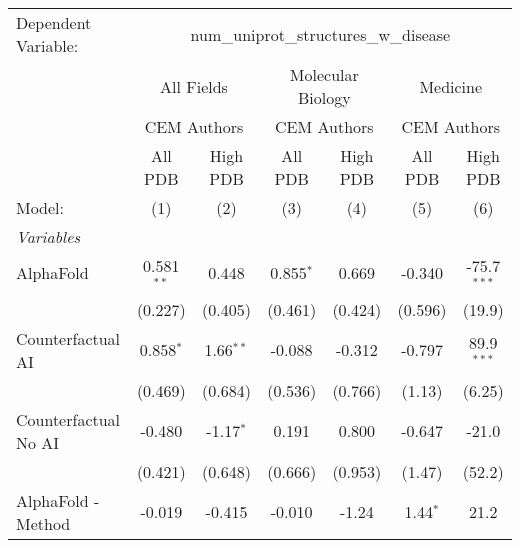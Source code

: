 \begingroup
\centering
\begin{tabular}{lcccccc}
   \tabularnewline \midrule \midrule
   Dependent Variable: & \multicolumn{6}{c}{num\_uniprot\_structures\_w\_disease}\\
 & \multicolumn{2}{c}{All Fields} & \multicolumn{2}{c}{Molecular Biology} & \multicolumn{2}{c}{Medicine} \\
\cmidrule(lr){2-3} \cmidrule(lr){4-5} \cmidrule(lr){6-7}
 & \multicolumn{2}{c}{CEM Authors} & \multicolumn{2}{c}{CEM Authors} & \multicolumn{2}{c}{CEM Authors} \\
\cmidrule(lr){2-3} \cmidrule(lr){4-5} \cmidrule(lr){6-7}
 & \multicolumn{1}{c}{All PDB} & \multicolumn{1}{c}{High PDB} & \multicolumn{1}{c}{All PDB} & \multicolumn{1}{c}{High PDB} & \multicolumn{1}{c}{All PDB} & \multicolumn{1}{c}{High PDB} \\
\cmidrule(lr){2-2} \cmidrule(lr){3-3} \cmidrule(lr){4-4} \cmidrule(lr){5-5} \cmidrule(lr){6-6} \cmidrule(lr){7-7}
   Model:                                                     & (1)          & (2)           & (3)          & (4)           & (5)           & (6)\\  
   \midrule
   \emph{Variables}\\
   AlphaFold                                                  & 0.581$^{**}$ & 0.448         & 0.855$^{*}$  & 0.669         & -0.340        & -75.7$^{***}$\\   
                                                              & (0.227)      & (0.405)       & (0.461)      & (0.424)       & (0.596)       & (19.9)\\   
   Counterfactual AI                                          & 0.858$^{*}$  & 1.66$^{**}$   & -0.088       & -0.312        & -0.797        & 89.9$^{***}$\\   
                                                              & (0.469)      & (0.684)       & (0.536)      & (0.766)       & (1.13)        & (6.25)\\   
   Counterfactual No AI                                       & -0.480       & -1.17$^{*}$   & 0.191        & 0.800         & -0.647        & -21.0\\   
                                                              & (0.421)      & (0.648)       & (0.666)      & (0.953)       & (1.47)        & (52.2)\\   
   AlphaFold - Method                                         & -0.019       & -0.415        & -0.010       & -1.24         & 1.44$^{*}$    & 21.2\\   

\end{tabular}
